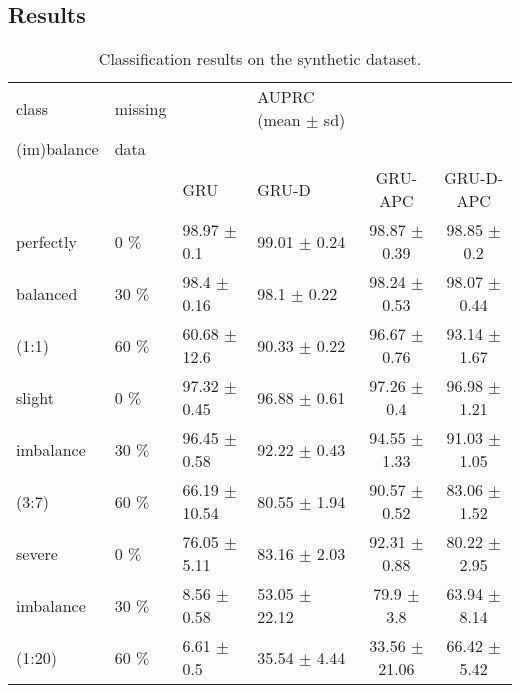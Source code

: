 \documentclass{article}
\begin{document}
\newpage
\subsection{\large Results}


\begin{table}[h]
\caption{
Classification results on the synthetic dataset.}
\label{tab:results_synthetic}
\vskip 0.1in
\begin{center}
\begin{small}
\begin{sc}
\begin{tabular}{llllcc}
\toprule
{class} & {missing} &  & AUPRC (mean $\pm$ sd) &  &  \\
{(im)balance} & {data} &  &  &  &  \\
\hline
 & & GRU & GRU-D & GRU-APC & GRU-D-APC  \\
\midrule
{perfectly} & {0 $\%$} &  98.97 $\pm$ 0.1 &  99.01 $\pm$ 0.24 &  98.87 $\pm$ 0.39 &  98.85 $\pm$ 0.2\\ \cline{2-6}

{balanced} & {30 $\%$} &  98.4 $\pm$ 0.16 & 98.1 $\pm$ 0.22 & 98.24 
$\pm$ 0.53 &  98.07 $\pm$ 0.44 \\ \cline{2-6}
{(1:1)} & {60 $\%$} &  60.68 $\pm$ 12.6 & 90.33 $\pm$ 0.22 &  
96.67 $\pm$ 0.76 &  93.14 $\pm$ 1.67  \\ 
\hline
{slight} & {0 $\%$} &  97.32 $\pm$ 0.45 &  96.88 $\pm$ 0.61 & 97.26 $\pm$ 0.4 &  96.98 $\pm$ 1.21 \\ \cline{2-6}
{imbalance} & {30 $\%$} &  96.45 $\pm$ 0.58 & 92.22 $\pm$ 0.43 &   94.55 $\pm$ 1.33 &  91.03 $\pm$ 1.05 \\ \cline{2-6}
{(3:7)} & {60 $\%$} &  66.19 $\pm$ 10.54 &  80.55 $\pm$ 1.94 &   90.57 $\pm$ 0.52 &  83.06 $\pm$ 1.52\\ 
\hline
{severe} & {0 $\%$} &  76.05 $\pm$ 5.11 &  83.16 $\pm$ 2.03 & 92.31 $\pm$ 0.88 &  80.22 $\pm$ 2.95 \\ \cline{2-6}
{imbalance} & {30 $\%$} &  8.56 $\pm$ 0.58 &  53.05 $\pm$ 22.12 &  79.9 $\pm$ 3.8 &  63.94 $\pm$ 8.14 \\ \cline{2-6}
{(1:20)} & {60 $\%$} &  6.61 $\pm$ 0.5 &  35.54 $\pm$ 4.44 & 33.56 $\pm$ 21.06 &  66.42 $\pm$ 5.42\\
\bottomrule
\end{tabular}
\end{sc}
\end{small}
\end{center}
\vskip -0.15in
\end{table}
\end{document}
